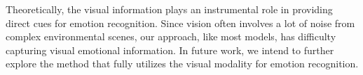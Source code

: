 \documentclass[journal]{IEEEtran}
\begin{document}
Theoretically, the visual information plays an instrumental role in providing direct cues for emotion recognition. Since vision often involves a lot of noise from complex environmental scenes, our approach, like most models, has difficulty capturing visual emotional information. In future work, we intend to further explore the method that fully utilizes the visual modality for emotion recognition.



\end{document}
